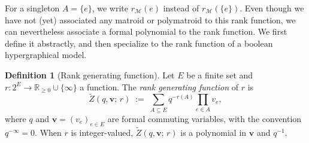 \documentclass[11pt,reqno]{amsart}
\newcommand{\vecv}{\boldsymbol{v}}
\newcommand{\Mo}{\mathcal{M}}
\theoremstyle{plain}
\theoremstyle{definition}
\newtheorem{definition}[theorem]{Definition}
\numberwithin{equation}{section}
\begin{document}
For a singleton $A = \{e\}$, we write $r_{\Mo}(e)$ instead of $r_{\Mo}(\{e\})$. Even though we have not (yet) associated any matroid or polymatroid to this rank function, we can nevertheless associate a formal polynomial to the rank function. We first define it abstractly, and then specialize to the rank function of a boolean hypergraphical model.
\begin{definition}[Rank generating function]
\label{def:abstract_rankpoly}
Let $E$ be a finite set and $r \colon 2^E \to \mathbb{R}_{\geq 0} \cup
\{\infty\}$ a function. The \emph{rank generating function}
of $r$ is
\[
    \widetilde Z(q, \vecv;\, r)
    \;:=\;
    \sum_{A \subseteq E} q^{-r(A)} \prod_{e \in A} v_e,
\]
where $q$ and $\vecv = (v_e)_{e \in E}$ are formal commuting variables,
with the convention $q^{-\infty} = 0$. When $r$ is integer-valued,
$\widetilde Z(q, \vecv;\, r)$ is a polynomial in $\vecv$ and $q^{-1}$.
\end{definition}
\end{document}
